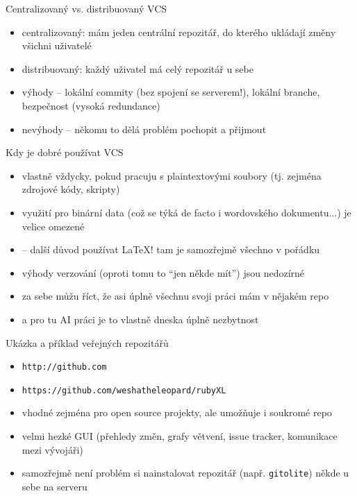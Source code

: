 \documentclass{beamer}
\begin{document}
\begin{frame}{Centralizovaný vs. distribuovaný VCS}
  \begin{itemize}
    \item centralizovaný: mám jeden centrální repozitář, do kterého ukládají změny všichni uživatelé
    \item distribuovaný: každý uživatel má celý repozitář u sebe
    \item výhody -- lokální commity (bez spojení se serverem!), lokální branche, bezpečnost (vysoká redundance)
    \item nevýhody -- někomu to dělá problém pochopit a přijmout
  \end{itemize}
\end{frame}

\begin{frame}{Kdy je dobré používat VCS}
  \begin{itemize}
    \item vlastně vždycky, pokud pracuju s plaintextovými soubory (tj. zejména zdrojové kódy, skripty)
    \item využití pro binární data (což se týká de facto i wordovského dokumentu...) je velice omezené
    \item -- další důvod používat LaTeX! tam je samozřejmě všechno v pořádku
    \item výhody verzování (oproti tomu to ``jen někde mít'') jsou nedozírné
    \item za sebe můžu říct, že asi úplně všechnu svoji práci mám v nějakém repo
    \item a pro tu AI práci je to vlastně dneska úplně nezbytnost
  \end{itemize}
\end{frame}

\begin{frame}{Ukázka a příklad veřejných repozitářů}
  \begin{itemize}
    \item \texttt{http://github.com}
    \item \texttt{https://github.com/weshatheleopard/rubyXL}
    \item vhodné zejména pro open source projekty, ale umožňuje i soukromé repo
    \item velmi hezké GUI (přehledy změn, grafy větvení, issue tracker, komunikace mezi vývojáři)
    \item samozřejmě není problém si nainstalovat repozitář (např. \texttt{gitolite}) někde u sebe na serveru
  \end{itemize}
\end{frame}
\end{document}
